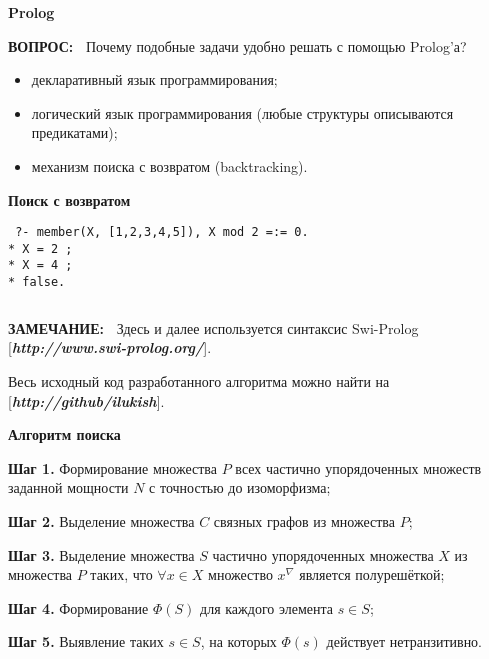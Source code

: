 \documentclass{beamer}
\newcommand{\green}{\color[rgb]{0,0.4,0}}
\newcommand{\blue}{\color{blue}}
\newcommand{\remark}{%
     {\bf \green ЗАМЕЧАНИЕ:\ }}
\newcommand{\question}{%
     {\bf \green ВОПРОС:\ }}
\newcommand{\retline}{

$ $

}
\begin{document}
\begin{frame} 
{\bf {\blue} Prolog }

{\question} Почему подобные задачи удобно решать с помощью Prolog'а?

\begin{itemize}
\item
декларативный язык программирования;
\item
логический язык программирования (любые структуры описываются предикатами);
\item
механизм поиска с возвратом (backtracking).
\end{itemize}

\end{frame}

\begin{frame}[fragile]
{\bf {\blue} Поиск с возвратом }

{\tt
?- member(X, [1,2,3,4,5]), X mod 2 =:= 0. \\*
\pause
X = 2 ; \\*
\pause
X = 4 ; \\*
\pause
false.
}

\pause
{\retline}

{\remark} Здесь и далее используется синтаксис Swi-Prolog
[\textit{{\bf {\blue http://www.swi-prolog.org/}}}].

Весь исходный код разработанного алгоритма можно найти на
[\textit{{\bf {\blue http://github/ilukish}}}].

\end{frame}

\begin{frame}
{\bf {\blue} Алгоритм поиска}

{\bf Шаг 1.}
Формирование множества $P$ всех частично упорядоченных множеств заданной мощности $N$ с точностью до изоморфизма;
\pause

{\bf Шаг 2.}
Выделение множества $C$ связных графов из множества $P$;
\pause

{\bf Шаг 3.}
Выделение множества $S$ частично упорядоченных множества $X$ из множества $P$ таких, что $\forall x \in X$ множество $x^\nabla$ является полурешёткой;
\pause

{\bf Шаг 4.}
Формирование $\Phi(S)$ для каждого элемента $s \in S$;
\pause

{\bf Шаг 5.}
Выявление таких $s \in S$, на которых $\Phi(s)$  действует нетранзитивно.

\end{frame}
\end{document}
